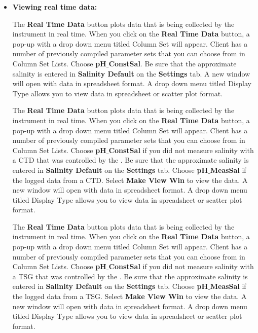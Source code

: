 \begin{itemize}
    \fi
    
    \item[] \textbf{Viewing real time data:}
    
    \ifcase \inst	%
    
     The \textbf{Real Time Data} button plots data that is being collected by the instrument in real time. When you click on the \textbf{Real Time Data} button, a pop-up with a drop down menu titled Column Set will appear. \instType{} Client has a number of previously compiled parameter sets that you can choose from in Column Set Lists. Choose \textbf{pH$\_$ConstSal}. Be sure that the approximate salinity is entered in \textbf{Salinity Default} on the \textbf{Settings} tab. A new window will open with data in spreadsheet format. A drop down menu titled Display Type allows you to view data in spreadsheet or scatter plot format.

    \or			%
    
      The \textbf{Real Time Data} button plots data that is being collected by the instrument in real time. When you click on the \textbf{Real Time Data} button, a pop-up with a drop down menu titled Column Set will appear. \instType{} Client has a number of previously compiled parameter sets that you can choose from in Column Set Lists. Choose \textbf{pH$\_$ConstSal} if you did not measure salinity with a CTD that was controlled by the \instType{}.  Be sure that the approximate salinity is entered in \textbf{Salinity Default} on the \textbf{Settings} tab.  Choose \textbf{pH$\_$MeasSal} if the \instType{} logged data from a CTD. Select \textbf{Make View Win} to view the data. A new window will open with data in spreadsheet format. A drop down menu titled Display Type allows you to view data in spreadsheet or scatter plot format.

    \or			%
      The \textbf{Real Time Data} button plots data that is being collected by the instrument in real time. When you click on the \textbf{Real Time Data} button, a pop-up with a drop down menu titled Column Set will appear. \instType{} Client has a number of previously compiled parameter sets that you can choose from in Column Set Lists. Choose \textbf{pH$\_$ConstSal} if you did not measure salinity with a TSG that was controlled by the \instType{}.  Be sure that the approximate salinity is entered in \textbf{Salinity Default} on the \textbf{Settings} tab.  Choose \textbf{pH$\_$MeasSal} if the \instType{} logged data from a TSG. Select \textbf{Make View Win} to view the data. A new window will open with data in spreadsheet format. A drop down menu titled Display Type allows you to view data in spreadsheet or scatter plot format.
    

\end{itemize}
